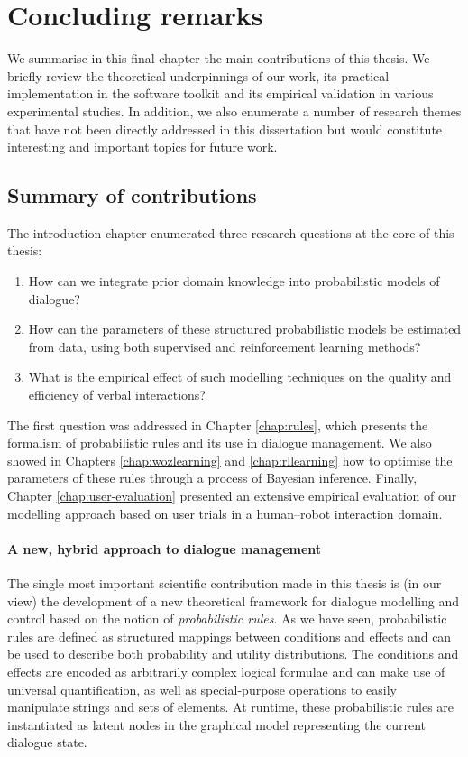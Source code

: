 \chapter{Concluding remarks}
\label{chap:conclusions}

We summarise in this final chapter the main contributions of this thesis.  We briefly review the theoretical underpinnings of our work, its practical implementation in the \opendial software toolkit and its empirical validation in various experimental studies.  In addition, we also enumerate a number of research themes that have not been directly addressed in this dissertation but would constitute interesting and important topics for future work. 

\section{Summary of contributions}

The introduction chapter enumerated three research questions at the core of this thesis:
\begin{enumerate}
\item How can we integrate prior domain knowledge into probabilistic models of dialogue?
\item How can the parameters of these structured probabilistic models be estimated from data, using both supervised and reinforcement learning methods?  
\item What is the empirical effect of such modelling techniques on the quality and efficiency of verbal interactions?
\end{enumerate}

The first question was addressed in Chapter \ref{chap:rules}, which presents the formalism of probabilistic rules and its use in dialogue management.  We also showed in Chapters \ref{chap:wozlearning} and \ref{chap:rllearning} how to optimise the parameters of these rules through a process of Bayesian inference.  Finally, Chapter \ref{chap:user-evaluation} presented an extensive empirical evaluation of our modelling approach based on user trials in a human--robot interaction domain.

\subsubsection*{A new, hybrid approach to dialogue management}

The single most important scientific contribution made in this thesis is (in our view) the development of a new theoretical framework for dialogue modelling and control based on the notion of \textit{probabilistic rules}.  As we have seen, probabilistic rules are defined as structured mappings between conditions and effects and can be used to describe both probability and utility distributions.  The conditions and effects are encoded as arbitrarily complex logical formulae and can make use of universal quantification, as well as special-purpose operations to easily manipulate strings and sets of elements. At runtime, these probabilistic rules are instantiated as latent nodes in the graphical model representing the current dialogue state.  

